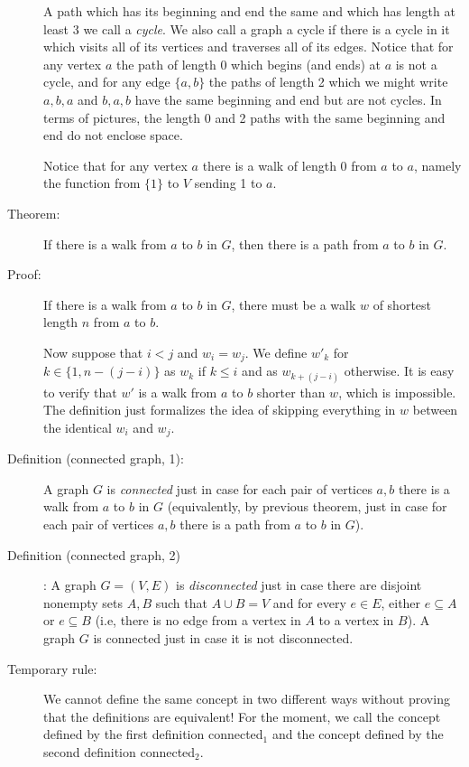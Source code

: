 \documentclass[12pt]{article}
\begin{document}
\begin{description}
A path which has its beginning and end the same and which has length at least 3 we call a {\em cycle\/}.  We also call a graph a cycle if there is a cycle in it which visits all of its vertices and traverses all of its edges.  Notice that for any vertex $a$ the path of length 0 which begins (and ends) at $a$ is not a cycle, and for any edge $\{a,b\}$ the paths of length 2 which we might write $a,b,a$ and $b,a,b$ have the same beginning and end but are not cycles.  In terms of pictures, the length 0 and 2 paths with the same beginning and end do not enclose space.

Notice that for
any vertex $a$ there is a walk of length 0 from $a$ to $a$, namely the function from $\{1\}$ to $V$ sending 1 to $a$.

\item[Theorem:]  If there is a walk from $a$ to $b$ in $G$, then there is a path from $a$ to $b$ in $G$.

\item[Proof:]  If there is a walk from $a$ to $b$ in $G$, there must be a walk $w$ of shortest length $n$ from $a$ to $b$.

Now suppose that $i < j$ and $w_i = w_j$.  We define $w'_k$  for $k \in \{1,n-(j-i)\}$ as  $w_k$ if $k \leq i$ and as $w_{k+(j-i)}$ otherwise.  It is easy to verify that $w'$ is a walk from $a$ to $b$ shorter than $w$, which is impossible.  The definition just formalizes the idea of skipping everything in $w$ between the identical $w_i$ and $w_j$.

\item[Definition (connected graph, 1):]  A graph $G$ is {\em connected\/} just in case for each pair of vertices $a,b$
there is a walk from $a$ to $b$ in $G$ (equivalently, by previous theorem, just in case for each pair of vertices $a,b$ there is a path from $a$ to $b$ in $G$).

\item[Definition (connected graph, 2)]:  A graph $G=(V,E)$ is {\em disconnected\/} just in case there
are disjoint nonempty sets $A,B$ such that $A \cup B = V$ and for every $e \in E$, either $e \subseteq A$ or $e \subseteq B$ (i.e, there is no edge from a vertex in $A$ to a vertex in $B$).  A graph $G$ is connected just in case it is not disconnected.

\item[Temporary rule:]  We cannot define the same concept in two different ways without proving that the definitions are equivalent!  For the moment, we call the concept defined by the first definition connected$_1$ and the concept defined by the second definition connected$_2$.


\end{description}
\end{document}

